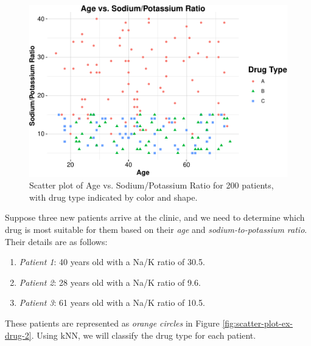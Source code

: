 \documentclass[
]{book}
\providecommand{\tightlist}{%
  \setlength{\itemsep}{0pt}\setlength{\parskip}{0pt}}
\theoremstyle{definition}
\theoremstyle{definition}
\theoremstyle{definition}
\theoremstyle{definition}
\theoremstyle{remark}
\begin{document}
\begin{figure}

{\centering \includegraphics[width=0.95\linewidth]{knn_files/figure-latex/scatter-plot-ex-drug-1} 

}

\caption{Scatter plot of Age vs. Sodium/Potassium Ratio for 200 patients, with drug type indicated by color and shape.}\label{fig:scatter-plot-ex-drug}
\end{figure}

Suppose three new patients arrive at the clinic, and we need to determine which drug is most suitable for them based on their \emph{age} and \emph{sodium-to-potassium ratio}. Their details are as follows:

\begin{enumerate}
\def\labelenumi{\arabic{enumi}.}
\tightlist
\item
  \emph{Patient 1}: 40 years old with a Na/K ratio of 30.5.\\
\item
  \emph{Patient 2}: 28 years old with a Na/K ratio of 9.6.\\
\item
  \emph{Patient 3}: 61 years old with a Na/K ratio of 10.5.
\end{enumerate}

These patients are represented as \emph{orange circles} in Figure \ref{fig:scatter-plot-ex-drug-2}. Using kNN, we will classify the drug type for each patient.
\end{document}
